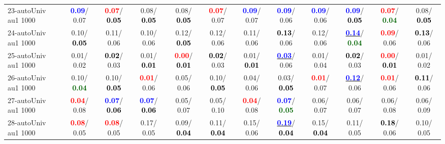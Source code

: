 \begin{table}[h]
\begin{center}
{\begin{tabular}{lc|c|c|c|c|c|c|c|c|c|c}
23-autoUniv au1 1000 & \textcolor{blue}{\textbf{  0.09}}/  0.07 & \textcolor{red}{\textbf{  0.07}}/\textcolor{black}{\textbf{  0.05}} &   0.08/\textcolor{black}{\textbf{  0.05}} &   0.08/\textcolor{black}{\textbf{  0.05}} & \textcolor{red}{\textbf{  0.07}}/  0.07 & \textcolor{blue}{\textbf{  0.09}}/  0.07 & \textcolor{blue}{\textbf{  0.09}}/  0.06 & \textcolor{blue}{\textbf{  0.09}}/  0.06 & \textcolor{blue}{\textbf{  0.09}}/\textcolor{black}{\textbf{  0.05}} & \textcolor{red}{\textbf{  0.07}}/\textcolor{darkgreen}{\textbf{  0.04}} &   0.08/\textcolor{black}{\textbf{  0.05}} \\
24-autoUniv au1 1000 &   0.10/\textcolor{black}{\textbf{  0.05}} &   0.11/  0.06 &   0.10/  0.06 &   0.12/\textcolor{black}{\textbf{  0.05}} &   0.12/  0.06 &   0.11/  0.06 & \textcolor{black}{\textbf{  0.13}}/  0.06 &   0.12/  0.06 & \underline{\textcolor{blue}{\textbf{  0.14}}}/\textcolor{darkgreen}{\textbf{  0.04}} & \textcolor{red}{\textbf{  0.09}}/  0.06 & \textcolor{black}{\textbf{  0.13}}/  0.06 \\
25-autoUniv au1 1000 &   0.01/  0.02 & \textcolor{black}{\textbf{  0.02}}/  0.03 &   0.01/\textcolor{black}{\textbf{  0.01}} & \textcolor{red}{\textbf{  0.00}}/\textcolor{black}{\textbf{  0.01}} & \textcolor{black}{\textbf{  0.02}}/  0.03 &   0.01/\textcolor{black}{\textbf{  0.01}} & \underline{\textcolor{blue}{\textbf{  0.03}}}/  0.06 &   0.01/  0.04 & \textcolor{black}{\textbf{  0.02}}/  0.03 & \textcolor{red}{\textbf{  0.00}}/\textcolor{black}{\textbf{  0.01}} &   0.01/  0.02 \\
26-autoUniv au1 1000 &   0.10/\textcolor{darkgreen}{\textbf{  0.04}} &   0.10/\textcolor{black}{\textbf{  0.05}} & \textcolor{red}{\textbf{  0.01}}/  0.06 &   0.05/  0.06 &   0.10/\textcolor{black}{\textbf{  0.05}} &   0.04/  0.06 &   0.03/\textcolor{black}{\textbf{  0.05}} & \textcolor{red}{\textbf{  0.01}}/  0.07 & \underline{\textcolor{blue}{\textbf{  0.12}}}/  0.06 & \textcolor{red}{\textbf{  0.01}}/  0.06 & \textcolor{black}{\textbf{  0.11}}/  0.06 \\
27-autoUniv au1 1000 & \textcolor{red}{\textbf{  0.04}}/  0.08 & \textcolor{blue}{\textbf{  0.07}}/\textcolor{black}{\textbf{  0.06}} & \textcolor{blue}{\textbf{  0.07}}/\textcolor{black}{\textbf{  0.06}} &   0.05/  0.07 &   0.05/  0.10 & \textcolor{red}{\textbf{  0.04}}/  0.08 & \textcolor{blue}{\textbf{  0.07}}/\textcolor{darkgreen}{\textbf{  0.05}} &   0.06/  0.07 &   0.06/  0.07 &   0.06/  0.08 &   0.06/  0.09 \\
28-autoUniv au1 1000 & \textcolor{red}{\textbf{  0.08}}/  0.05 & \textcolor{red}{\textbf{  0.08}}/  0.05 &   0.17/  0.05 &   0.09/\textcolor{black}{\textbf{  0.04}} &   0.11/\textcolor{black}{\textbf{  0.04}} &   0.15/  0.06 & \underline{\textcolor{blue}{\textbf{  0.19}}}/\textcolor{black}{\textbf{  0.04}} &   0.15/\textcolor{black}{\textbf{  0.04}} &   0.11/  0.05 & \textcolor{black}{\textbf{  0.18}}/  0.06 &   0.10/  0.05 \\ \hline

\end{tabular}}
\end{center}
\end{table}
